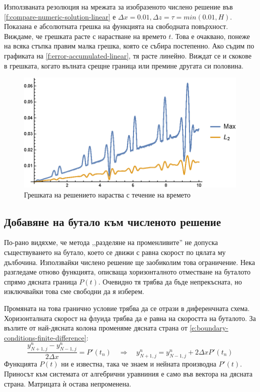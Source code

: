 \documentclass[12pt]{article}
\numberwithin{equation}{section}
\begin{document}
Използваната резолюция на мрежата за изобразеното числено решение във \autoref{f:compare-numeric-solution-linear} е $\Delta x=0.01, \Delta z = \tau = min(0.01, H)$. Показана е абсолютната грешка на функцията на свободната повърхност. Виждаме, че грешката расте с нарастване на времето $t$. Това е очаквано, понеже на всяка стъпка правим малка грешка, която се събира постепенно. Ако съдим по графиката на \autoref{f:error-accumulated-linear}, тя расте линейно. Виждат се и скокове в грешката, когато вълната срещне граница или премине другата си половина.

\begin{figure}[h]
    \centering
    \includegraphics{figures/results/error-accumulated.eps}
    \caption{Грешката на решението нараства с течение на времето}
    \label{f:error-accumulated-linear}
\end{figure}

\subsection{Добавяне на бутало към численото решение}
По-рано видяхме, че метода ,,разделяне на променливите'' не допуска съществуването на бутало, което се движи с равна скорост по цялата му дълбочина. Използвайки числено решение ще заобиколим това ограничение. Нека разгледаме отново функцията, описваща хоризонталното отместване на буталото спрямо дясната граница $P(t)$. Очевидно тя трябва да бъде непрекъсната, но изключвайки това сме свободни да я изберем.

Промяната на това гранично условие трябва да се отрази в диференчната схема. Хоризонталната скорост на флуида трябва да е равна на скоростта на буталото. За възлите от най-дясната колона променяме дясната страна от \autoref{e:boundary-conditions-finite-difference}:
\begin{equation}
    \frac{y^n_{N+1,j} - y^n_{N-1,j}}{2\Delta x} = P'(t_n) \quad\Rightarrow\quad y^n_{N+1,j} = y^n_{N-1,j} + 2\Delta x P'(t_n)
\end{equation}
Функцията $P(t)$ ни е известна, така че знаем и нейната производна $P'(t)$. Приносът към системата от алгебрични уравниния е само във вектора на дясната страна. Матрицата ѝ остава непроменена.
\end{document}
